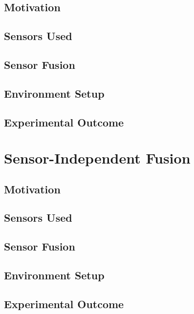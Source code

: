 \subsection{Motivation}

\subsection{Sensors Used}

\subsection{Sensor Fusion}

\subsection{Environment Setup}

\subsection{Experimental Outcome}


\section{Sensor-Independent Fusion}

\subsection{Motivation}

\subsection{Sensors Used}

\subsection{Sensor Fusion}

\subsection{Environment Setup}

\subsection{Experimental Outcome}